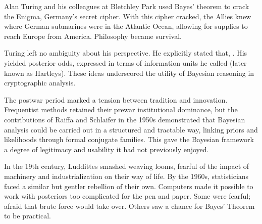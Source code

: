Alan Turing and his colleagues at Bletchley Park used Bayes' theorem to crack the Enigma, Germany's secret cipher.  
With this cipher cracked, the Allies knew where German submarines were in the Atlantic Ocean, allowing for supplies to reach Europe from America.  Philosophy became survival.

Turing left no ambiguity about his perspective. 
He explicitly stated that,  \cite{taylor_alan_2015}.  
His  yielded posterior odds, expressed in terms of information units he called  (later known as Hartleys). 
These ideas underscored the utility of Bayesian reasoning in cryptographic analysis.

The postwar period marked a tension between tradition and innovation.  
Frequentist methods retained their prewar institutional dominance, but the contributions of Raiffa and Schlaifer in the 1950s demonstrated that Bayesian analysis could be carried out in a structured and tractable way, 
linking priors and likelihoods through formal conjugate families\cite{fienberg_when_2006}.  
This gave the Bayesian framework a degree of legitimacy and usability it had not previously enjoyed.  

In the 19th century, Luddittes smashed weaving looms, fearful of the impact of machinery and industrialization on their way of life.  
By the 1960s, statisticians faced a similar but gentler rebellion of their own.  
Computers made it possible to work with posteriors too complicated for the pen and paper.  
Some were fearful; afraid that brute force would take over.  
Others saw a chance for Bayes' Theorem to be practical.